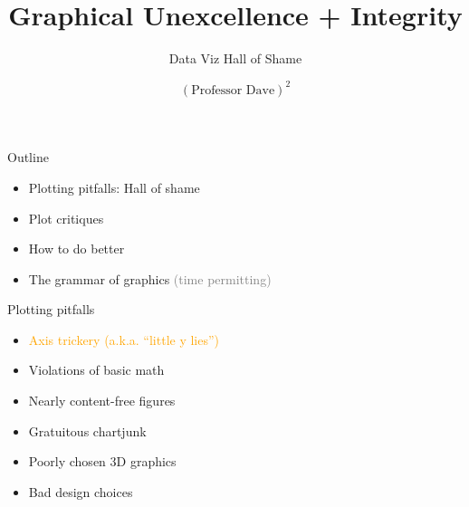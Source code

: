 \documentclass[
  ignorenonframetext,
]{beamer}
\title{Graphical Unexcellence + Integrity}
\subtitle{Data Viz Hall of Shame}
\author{\((\text{Professor Dave})^2\)}
\date{}
\institute{The University of Austin}
\providecommand{\tightlist}{%
  \setlength{\itemsep}{0pt}\setlength{\parskip}{0pt}}
\begin{document}
\frame{\titlepage}

\begin{frame}{Outline}
\label{outline}
\begin{itemize}
\tightlist
\item
  Plotting pitfalls: Hall of shame
\item
  Plot critiques
\item
  How to do better
\item
  The grammar of graphics \textcolor{gray}{(time permitting)}
\end{itemize}
\end{frame}

\begin{frame}{Plotting pitfalls}
\label{plotting-pitfalls}
\begin{itemize}
\tightlist
\item
  \textcolor{orange}{Axis trickery (a.k.a. “little y lies”)}
\item
  Violations of basic math
\item
  Nearly content-free figures
\item
  Gratuitous chartjunk
\item
  Poorly chosen 3D graphics
\item
  Bad design choices
\end{itemize}
\end{frame}

\begin{frame}{}
\label{section}

\end{frame}
\end{document}
